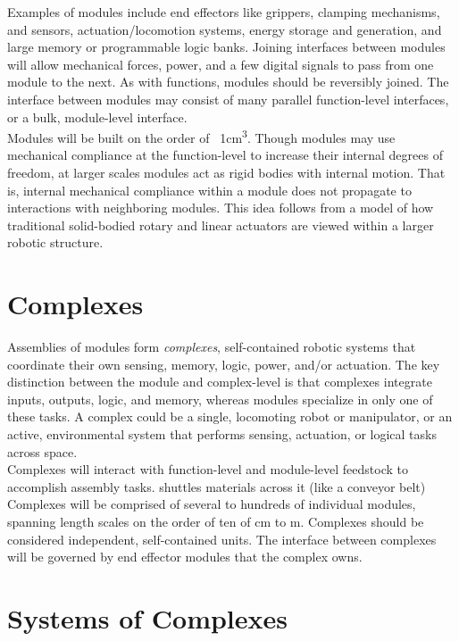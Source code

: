 {Examples of modules include end effectors like grippers, clamping mechanisms, and sensors, actuation/locomotion systems, energy storage and generation, and large memory or programmable logic banks.  Joining interfaces between modules will allow mechanical forces, power, and a few digital signals to pass from one module to the next.  As with functions, modules should be reversibly joined.  The interface between modules may consist of many parallel function-level interfaces, or a bulk, module-level interface.\\

Modules will be built on the order of ~1cm\textsuperscript{3}.  Though modules may use mechanical compliance at the function-level to increase their internal degrees of freedom, at larger scales modules act as rigid bodies with internal motion.  That is, internal mechanical compliance within a module does not propagate to interactions with neighboring modules.  This idea follows from a model of how traditional solid-bodied rotary and linear actuators are viewed within a larger robotic structure.

\section{Complexes}

Assemblies of modules form \textit{complexes}, self-contained robotic systems that coordinate their own sensing, memory, logic, power, and/or actuation.  The key distinction between the module and complex-level is that complexes integrate inputs, outputs, logic, and memory, whereas modules specialize in only one of these tasks.  A complex could be a single, locomoting robot or manipulator, or an active, environmental system that performs sensing, actuation, or logical tasks across space.\\

Complexes will interact with function-level and module-level feedstock to accomplish assembly tasks.  shuttles materials across it (like a conveyor belt)\\

Complexes will be comprised of several to hundreds of individual modules, spanning length scales on the order of ten of cm to m.  Complexes should be considered independent, self-contained units.  The interface between complexes will be governed by end effector modules that the complex owns.

\section{Systems of Complexes}

}
